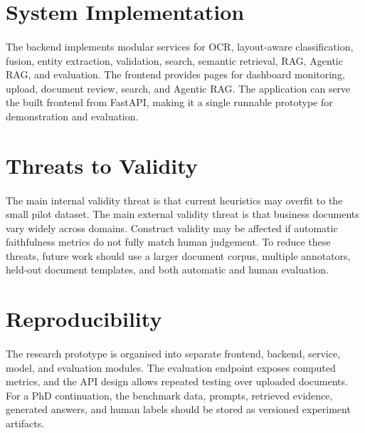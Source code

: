 \section{System Implementation}
\paragraph{} The backend implements modular services for OCR, layout-aware classification, fusion, entity extraction, validation, search, semantic retrieval, RAG, Agentic RAG, and evaluation. The frontend provides pages for dashboard monitoring, upload, document review, search, and Agentic RAG. The application can serve the built frontend from FastAPI, making it a single runnable prototype for demonstration and evaluation.

\section{Threats to Validity}
\paragraph{} The main internal validity threat is that current heuristics may overfit to the small pilot dataset. The main external validity threat is that business documents vary widely across domains. Construct validity may be affected if automatic faithfulness metrics do not fully match human judgement. To reduce these threats, future work should use a larger document corpus, multiple annotators, held-out document templates, and both automatic and human evaluation.

\section{Reproducibility}
\paragraph{} The research prototype is organised into separate frontend, backend, service, model, and evaluation modules. The evaluation endpoint exposes computed metrics, and the API design allows repeated testing over uploaded documents. For a PhD continuation, the benchmark data, prompts, retrieved evidence, generated answers, and human labels should be stored as versioned experiment artifacts.
